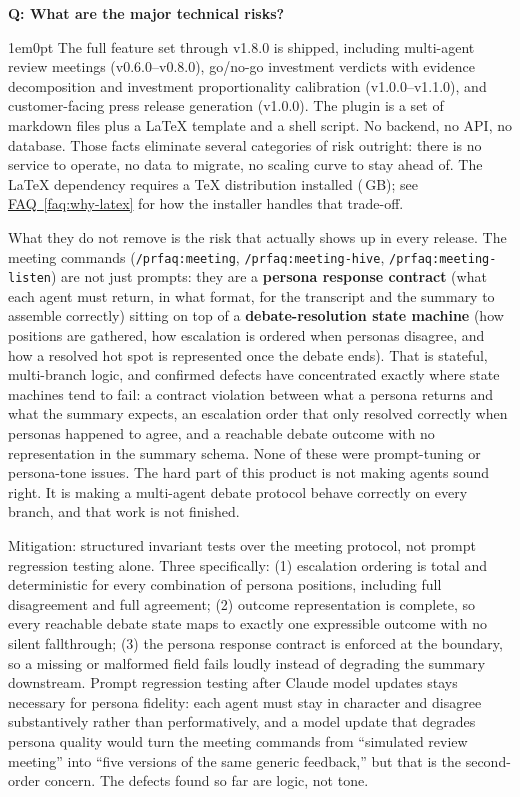 \documentclass[11pt,letterpaper]{article}
\newcounter{faqnum}
\newenvironment{faqpair}[1]{%
  \needspace{4\baselineskip}%
  \vspace{0.5em}%
  \refstepcounter{faqnum}%
  \noindent\textbf{\color{SectionBlue}Q\thefaqnum: #1}\par\nopagebreak[4]%
  \vspace{0.2em}%
  \begin{adjustwidth}{1em}{0pt}%
  \setlength{\parindent}{0pt}%
}{%
  \end{adjustwidth}%
  \vspace{0.5em}%
}
\newcommand{\faqref}[1]{\hyperref[#1]{FAQ~\ref*{#1}}}
\begin{document}
\begin{faqpair}{What are the major technical risks?}\label{faq:technical-risks}
  The full feature set through v1.8.0 is shipped, including multi-agent review meetings (v0.6.0--v0.8.0), go/no-go investment verdicts with evidence decomposition and investment proportionality calibration (v1.0.0--v1.1.0), and customer-facing press release generation (v1.0.0). The plugin is a set of markdown files plus a LaTeX template and a shell script. No backend, no API, no database. Those facts eliminate several categories of risk outright: there is no service to operate, no data to migrate, no scaling curve to stay ahead of. The LaTeX dependency requires a TeX distribution installed (\,GB); see \faqref{faq:why-latex} for how the installer handles that trade-off.

  What they do not remove is the risk that actually shows up in every release. The meeting commands (\texttt{/prfaq:meeting}, \texttt{/prfaq:meeting-hive}, \texttt{/prfaq:meeting-listen}) are not just prompts: they are a \textbf{persona response contract} (what each agent must return, in what format, for the transcript and the summary to assemble correctly) sitting on top of a \textbf{debate-resolution state machine} (how positions are gathered, how escalation is ordered when personas disagree, and how a resolved hot spot is represented once the debate ends). That is stateful, multi-branch logic, and confirmed defects have concentrated exactly where state machines tend to fail: a contract violation between what a persona returns and what the summary expects, an escalation order that only resolved correctly when personas happened to agree, and a reachable debate outcome with no representation in the summary schema. None of these were prompt-tuning or persona-tone issues. The hard part of this product is not making agents sound right. It is making a multi-agent debate protocol behave correctly on every branch, and that work is not finished.

  Mitigation: structured invariant tests over the meeting protocol, not prompt regression testing alone. Three specifically: (1) escalation ordering is total and deterministic for every combination of persona positions, including full disagreement and full agreement; (2) outcome representation is complete, so every reachable debate state maps to exactly one expressible outcome with no silent fallthrough; (3) the persona response contract is enforced at the boundary, so a missing or malformed field fails loudly instead of degrading the summary downstream. Prompt regression testing after Claude model updates stays necessary for persona fidelity: each agent must stay in character and disagree substantively rather than performatively, and a model update that degrades persona quality would turn the meeting commands from ``simulated review meeting'' into ``five versions of the same generic feedback,'' but that is the second-order concern. The defects found so far are logic, not tone.


\end{faqpair}
\end{document}
